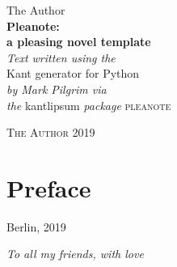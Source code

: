 \documentclass{pleanote} 	%
\def\theauthor{The Author}
\def\yourtitle{a pleasing novel template}
\def\year{2019}
\begin{document}
\setlength{\pdfpagewidth}{11.8cm} 	%
\setlength{\pdfpageheight}{17.7cm} 	%
\setlength{\parskip}{0cm} 					%
\begin{spacing}{0.96} 						%


\thispagestyle{empty}
\begin{center}
\huge\theauthor\\
\vspace{2.1cm}
\Huge \textbf{Pleanote:}\\
\textbf{\yourtitle}\\
\vspace{1.0cm}
\normalsize
\textit{Text written using the}\\
Kant generator for Python\\
\textit{by Mark Pilgrim via}\\
\textit{the} kantlipsum \textit{package}
\vfill
\Large\textsc{pleanote}
\end{center}


\newpage
\thispagestyle{empty}
\null
\vfill
\begin{center}
\textcopyright \textsc{\theauthor} \year
\end{center}


\chapter{Preface}
\setcounter{page}{3} 		%

\kant[23-28]

\vspace{0.5cm}
\hfill
\begin{flushleft}
\noindent Berlin, 2019\\
\end{flushleft}


\newpage
\thispagestyle{empty}
\vspace*{3.5cm}
\begin{flushright}
\textit{To all my friends, with love}
\end{flushright}




\end{spacing}
\end{document}
